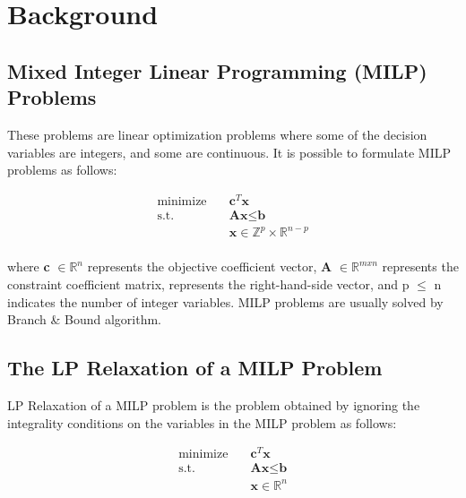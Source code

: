 \section{Background}\label{sec:background}

\subsection{Mixed Integer Linear Programming (MILP) Problems}\label{subsec:mixed-integer-linear-programming-(milp)-problems}
These problems are linear optimization problems where some of the decision variables are integers, and some are continuous.
It is possible to formulate MILP problems as follows:

\begin{equation}
    \begin{aligned}
        \text{minimize} \quad & \textbf{c}^T \textbf{x} \\
        \text{s.t.} \quad & \textbf{A}\textbf{x} \leq \textbf{b} \\
        & \textbf{x} \in \mathbb{Z}^p \times \mathbb{R}^{n-p}\\
    \end{aligned}\label{eq:equation}
\end{equation}


where \textbf{c} \begin{math} \in \mathbb{R}^n \end{math} represents the objective coefficient vector, \textbf{A} \begin{math} \in \mathbb{R}^{mxn} \end{math} represents the constraint coefficient matrix,  represents the right-hand-side vector, and  p \begin{math} \leq \end{math} n indicates the number of integer variables.
MILP problems are usually solved by Branch \& Bound algorithm.


\subsection{The LP Relaxation of a MILP Problem}\label{subsec:the-lp-relaxation-of-a-milp-problem}
LP Relaxation of a MILP problem is the problem obtained by ignoring the integrality conditions on the variables in the MILP problem as follows:

\begin{equation}
    \begin{aligned}
        \text{minimize} \quad & \textbf{c}^T \textbf{x} \\
        \text{s.t.} \quad & \textbf{A}\textbf{x} \leq \textbf{b} \\
        & \textbf{x} \in \mathbb{R}^{n}\\
    \end{aligned}\label{eq:equation}
\end{equation}


